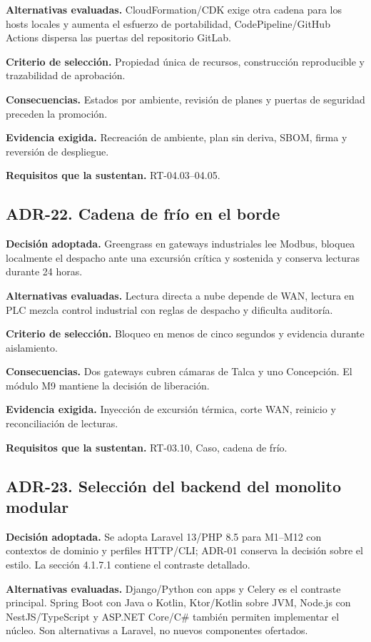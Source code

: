 \textbf{Alternativas evaluadas.} CloudFormation/CDK exige otra cadena para los hosts locales y aumenta el esfuerzo de portabilidad, CodePipeline/GitHub Actions dispersa las puertas del repositorio GitLab.

\textbf{Criterio de selección.} Propiedad única de recursos, construcción reproducible y trazabilidad de aprobación.

\textbf{Consecuencias.} Estados por ambiente, revisión de planes y puertas de seguridad preceden la promoción.

\textbf{Evidencia exigida.} Recreación de ambiente, plan sin deriva, SBOM, firma y reversión de despliegue.

\textbf{Requisitos que la sustentan.} RT-04.03--04.05.

\subsection*{ADR-22. Cadena de frío en el borde}
\label{sub:adr-22}
\textbf{Decisión adoptada.} Greengrass en gateways industriales lee Modbus, bloquea localmente el despacho ante una excursión crítica y sostenida y conserva lecturas durante 24 horas.

\textbf{Alternativas evaluadas.} Lectura directa a nube depende de WAN, lectura en PLC mezcla control industrial con reglas de despacho y dificulta auditoría.

\textbf{Criterio de selección.} Bloqueo en menos de cinco segundos y evidencia durante aislamiento.

\textbf{Consecuencias.} Dos gateways cubren cámaras de Talca y uno Concepción. El módulo M9 mantiene la decisión de liberación.

\textbf{Evidencia exigida.} Inyección de excursión térmica, corte WAN, reinicio y reconciliación de lecturas.

\textbf{Requisitos que la sustentan.} RT-03.10, Caso, cadena de frío.


\label{sub:adr-23}
\subsection*{ADR-23. Selección del backend del monolito modular}
\textbf{Decisión adoptada.} Se adopta Laravel 13/PHP 8.5 para M1--M12 con contextos de dominio y perfiles HTTP/CLI; ADR-01 conserva la decisión sobre el estilo. La sección 4.1.7.1 contiene el contraste detallado.

\textbf{Alternativas evaluadas.} Django/Python con apps y Celery es el contraste principal. Spring Boot con Java o Kotlin, Ktor/Kotlin sobre JVM, Node.js con NestJS/TypeScript y ASP.NET Core/C\# también permiten implementar el núcleo. Son alternativas a Laravel, no nuevos componentes ofertados.


